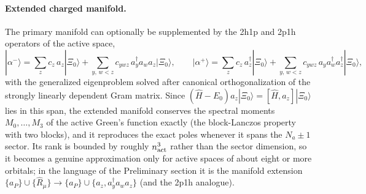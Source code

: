 \documentclass[11pt,a4paper]{article}
\newcommand{\ket}[1]{|#1\rangle}
\newcommand{\Pre}{Preliminary section}
\begin{document}
\paragraph{Extended charged manifold.}
The primary manifold can optionally be supplemented by the 2h1p and 2p1h
operators of the active space,
\begin{equation}
  \ket{\alpha^-}=\sum_z c_z\,a_z\ket{\Xi_0}+\sum_{y,\,w<z}c_{ywz}\,a_y^\dagger a_wa_z\ket{\Xi_0},
  \qquad
  \ket{\alpha^+}=\sum_z c_z\,a_z^\dagger\ket{\Xi_0}+\sum_{y,\,w<z}c_{ywz}\,a_ya_w^\dagger a_z^\dagger\ket{\Xi_0},
  \label{eq:ekt-extended}
\end{equation}
with the generalized eigenproblem solved after canonical orthogonalization
of the strongly linearly dependent Gram matrix.  Since
$(\hat H-E_0)a_z\ket{\Xi_0}=[\hat H,a_z]\ket{\Xi_0}$ lies in this span, the
extended manifold conserves the spectral moments $M_0,\ldots,M_3$ of the
active Green's function exactly (the block-Lanczos property with two
blocks), and it reproduces the exact poles whenever it spans the $N_a\pm1$
sector.  Its rank is bounded by roughly $n_{\rm act}^3$ rather than the
sector dimension, so it becomes a genuine approximation only for active
spaces of about eight or more orbitals; in the language of the \Pre{} it
is the manifold extension $\{a_P\}\cup\{\hat R_\mu\}\to
\{a_P\}\cup\{a_z, a_y^\dagger a_wa_z\}$ (and the 2p1h analogue).
\end{document}

